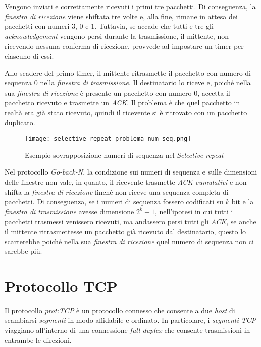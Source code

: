 Vengono inviati e correttamente ricevuti i primi tre pacchetti. Di conseguenza,
la \emph{finestra di ricezione} viene shiftata tre volte e, alla fine, rimane
in attesa dei pacchetti con numeri $3$, $0$ e $1$. Tuttavia, se accade che
tutti e tre gli \emph{acknowledgement} vengono persi durante la trasmissione, il
mittente, non ricevendo nessuna conferma di ricezione, provvede ad impostare un
timer per ciascuno di essi.

Allo scadere del primo timer, il mittente ritrasmette il pacchetto con numero di
sequenza $0$ nella \emph{finestra di trasmissione}. Il destinatario lo riceve e,
poiché nella sua \emph{finestra di ricezione} è presente un pacchetto con numero
$0$, accetta il pacchetto ricevuto e trasmette un \emph{ACK}. Il problema è che
quel pacchetto in realtà era già stato ricevuto, quindi il ricevente si è
ritrovato con un pacchetto duplicato.

\begin{figure}[ht]
    \centering
    \texttt{[image: selective-repeat-problema-num-seq.png]}
    \caption{Esempio sovrapposizione numeri di sequenza nel \emph{Selective repeat}}
\end{figure}

\begin{note}
    Nel protocollo \emph{Go-back-N}, la condizione sui numeri di sequenza e sulle
    dimensioni delle finestre non vale, in quanto, il ricevente trasmette
    \emph{ACK cumulativi} e non shifta la \emph{finestra di ricezione} finché non
    riceve una sequenza completa di pacchetti.
    Di conseguenza, se i numeri di sequenza fossero codificati su $k$ bit e la
    \emph{finestra di trasmissione} avesse dimensione $2^k-1$, nell'ipotesi in
    cui tutti i pacchetti trasmessi venissero ricevuti, ma andassero persi tutti
    gli \emph{ACK}, se anche il mittente ritrasmettesse un pacchetto già
    ricevuto dal destinatario, questo lo scarterebbe poiché nella sua
    \emph{finestra di ricezione} quel numero di sequenza non ci sarebbe più.
\end{note}

\section{Protocollo TCP}
Il protocollo \emph{\gls{prot:TCP}} è un protocollo connesso che consente a due
\emph{host} di scambiarsi \emph{segmenti} in modo affidabile e ordinato. In
particolare, i \emph{segmenti TCP} viaggiano all'interno di una connessione
\emph{full duplex} che consente trasmissioni in entrambe le direzioni.

